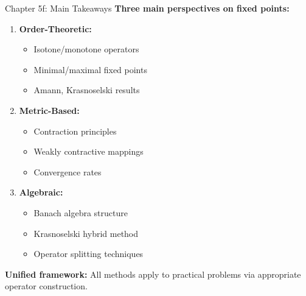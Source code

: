 \documentclass[aspectratio=169,10pt]{beamer}
\theoremstyle{plain}
\begin{document}
\begin{frame}{Chapter 5f: Main Takeaways}
  \textbf{Three main perspectives on fixed points:}

  \vspace{1em}

  \begin{enumerate}
    \item \textbf{Order-Theoretic:}
      \begin{itemize}
        \item Isotone/monotone operators
        \item Minimal/maximal fixed points
        \item Amann, Krasnoselski results
      \end{itemize}

    \item \textbf{Metric-Based:}
      \begin{itemize}
        \item Contraction principles
        \item Weakly contractive mappings
        \item Convergence rates
      \end{itemize}

    \item \textbf{Algebraic:}
      \begin{itemize}
        \item Banach algebra structure
        \item Krasnoselski hybrid method
        \item Operator splitting techniques
      \end{itemize}
  \end{enumerate}

  \vspace{1em}

  \textbf{Unified framework:} All methods apply to practical problems via appropriate operator construction.
\end{frame}
\end{document}
